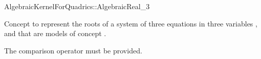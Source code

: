 \begin{ccRefConcept}{AlgebraicKernelForQuadrics::AlgebraicReal_3}

\ccDefinition

Concept to represent the roots of a system of three equations 
in three variables ,  and  that are models of concept
.

\ccOperations

The comparison operator \ccc{==} must be provided. 




\ccSeeAlso


\end{ccRefConcept}

